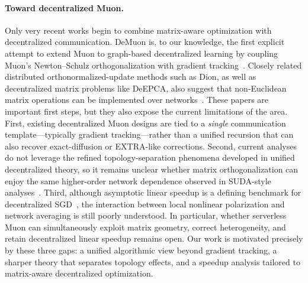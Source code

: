 \paragraph{Toward decentralized Muon.}
Only very recent works begin to combine matrix-aware optimization with decentralized communication. DeMuon is, to our knowledge, the first explicit attempt to extend Muon to graph-based decentralized learning by coupling Muon's Newton--Schulz orthogonalization with gradient tracking~\cite{he2025demuon}. Closely related distributed orthonormalized-update methods such as Dion, as well as decentralized matrix problems like DeEPCA, also suggest that non-Euclidean matrix operations can be implemented over networks~\cite{ahn2025dion,ye2021deepca}. These papers are important first steps, but they also expose the current limitations of the area. First, existing decentralized Muon designs are tied to a \emph{single} communication template---typically gradient tracking---rather than a unified recursion that can also recover exact-diffusion or EXTRA-like corrections. Second, current analyses do not leverage the refined topology-separation phenomena developed in unified decentralized theory, so it remains unclear whether matrix orthogonalization can enjoy the same higher-order network dependence observed in SUDA-style analyses~\cite{alghunaim2022unified,zhu2024sparkle,haomu2023speedup}. Third, although asymptotic linear speedup is a defining benchmark for decentralized SGD~\cite{lian2017dpsgd,lu2020optimal,koloskova2020unified}, the interaction between local nonlinear polarization and network averaging is still poorly understood. In particular, whether serverless Muon can simultaneously exploit matrix geometry, correct heterogeneity, and retain decentralized linear speedup remains open. Our work is motivated precisely by these three gaps: a unified algorithmic view beyond gradient tracking, a sharper theory that separates topology effects, and a speedup analysis tailored to matrix-aware decentralized optimization.
